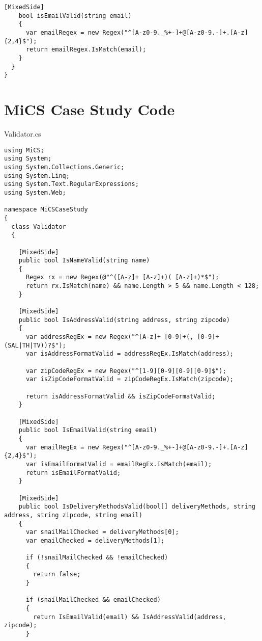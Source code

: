 \begin{appendices}
\begin{lstlisting}[language=CSharp,classoffset=1,morekeywords={Default, MiCSPage, Button, CheckBox, TextBox, EventArgs, Label, ClientSide, MixedSide, InputElement, CheckboxElement, Document, Window, Regex}]
    [MixedSide]
    bool isEmailValid(string email)
    {
      var emailRegex = new Regex("^[A-z0-9._%+-]+@[A-z0-9.-]+.[A-z]{2,4}$");
      return emailRegex.IsMatch(email);
    }
  }
}
\end{lstlisting}

\chapter{MiCS Case Study Code}
\label{case_study_appendix}

Validator.cs
\begin{lstlisting}[language=CSharp,classoffset=1,morekeywords={Default, MiCSPage, Button, CheckBox, TextBox, EventArgs, Label, ClientSide, MixedSide, InputElement, CheckboxElement, Document, Window, Regex, Validator}]       
using MiCS;
using System;
using System.Collections.Generic;
using System.Linq;
using System.Text.RegularExpressions;
using System.Web;

namespace MiCSCaseStudy
{
  class Validator
  {

    [MixedSide]
    public bool IsNameValid(string name)
    {
      Regex rx = new Regex(@"^([A-z]+ [A-z]+)( [A-z]+)*$");
      return rx.IsMatch(name) && name.Length > 5 && name.Length < 128;
    }

    [MixedSide]
    public bool IsAddressValid(string address, string zipcode)
    {
      var addressRegEx = new Regex("^[A-z]+ [0-9]+(, [0-9]+ (SAL|TH|TV))?$");
      var isAddressFormatValid = addressRegEx.IsMatch(address);

      var zipCodeRegEx = new Regex("^[1-9][0-9][0-9][0-9]$");
      var isZipCodeFormatValid = zipCodeRegEx.IsMatch(zipcode);

      return isAddressFormatValid && isZipCodeFormatValid;
    }

    [MixedSide]
    public bool IsEmailValid(string email)
    {
      var emailRegEx = new Regex("^[A-z0-9._%+-]+@[A-z0-9.-]+.[A-z]{2,4}$");
      var isEmailFormatValid = emailRegEx.IsMatch(email);
      return isEmailFormatValid;
    }

    [MixedSide]
    public bool IsDeliveryMethodsValid(bool[] deliveryMethods, string address, string zipcode, string email)
    {
      var snailMailChecked = deliveryMethods[0];
      var emailChecked = deliveryMethods[1];

      if (!snailMailChecked && !emailChecked)
      {
        return false;
      }

      if (snailMailChecked && emailChecked)
      {
        return IsEmailValid(email) && IsAddressValid(address, zipcode);
      }


\end{lstlisting}
\end{appendices}
